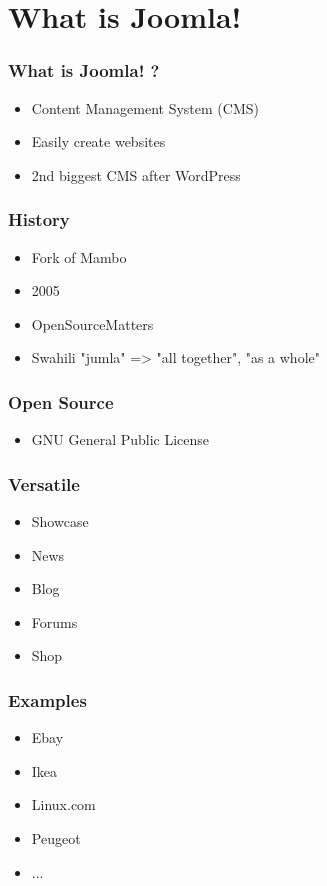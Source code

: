 \section{What is Joomla!}
\setcounter{subsection}{1}
\begin{frame}
\frametitle{What is Joomla! ?}
  \begin{itemize}[<+->]
    \item Content Management System (CMS)
    \item Easily create websites
    \item 2nd biggest CMS after WordPress
  \end{itemize}
\end{frame}

\begin{frame}
\frametitle{History}
  \begin{itemize}[<+->]
    \item Fork of Mambo
    \item 2005
    \item OpenSourceMatters
    \item Swahili "jumla" => "all together", "as a whole"
  \end{itemize}
\end{frame}

\begin{frame}
\frametitle{Open Source}
  \begin{itemize}[<+->]
    \item GNU General Public License
  \end{itemize}
\end{frame}

\begin{frame}
\frametitle{Versatile}
  \begin{itemize}[<+->]
    \item Showcase
    \item News
    \item Blog
    \item Forums
    \item Shop
  \end{itemize}
\end{frame}

\begin{frame}
\frametitle{Examples}
  \begin{itemize}[<+->]
    \item Ebay
    \item Ikea
    \item Linux.com
    \item Peugeot
    \item ...
  \end{itemize}
\end{frame}

